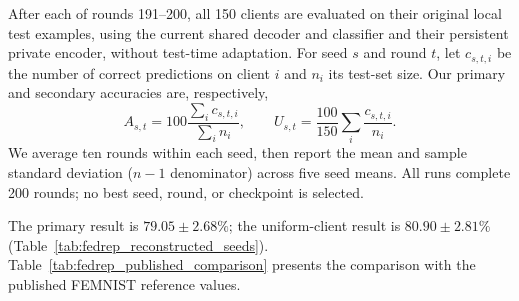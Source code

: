 After each of rounds 191--200, all 150 clients are evaluated on their
original local test examples, using the current shared decoder and
classifier and their persistent private encoder, without test-time
adaptation. For seed $s$ and round $t$, let $c_{s,t,i}$ be the number of
correct predictions on client $i$ and $n_i$ its test-set size. Our primary
and secondary accuracies are, respectively,
\[
 A_{s,t}=100\frac{\sum_i c_{s,t,i}}{\sum_i n_i},
 \qquad
 U_{s,t}=\frac{100}{150}\sum_i\frac{c_{s,t,i}}{n_i}.
\]
We average ten rounds within each seed, then report the mean and sample
standard deviation ($n-1$ denominator) across five seed means.
All runs complete 200 rounds; no best seed, round, or checkpoint is selected.

The primary result is $79.05\pm2.68\%$; the uniform-client result is
$80.90\pm2.81\%$ (Table~\ref{tab:fedrep_reconstructed_seeds}).
Table~\ref{tab:fedrep_published_comparison} presents the comparison with
the published FEMNIST reference values.

